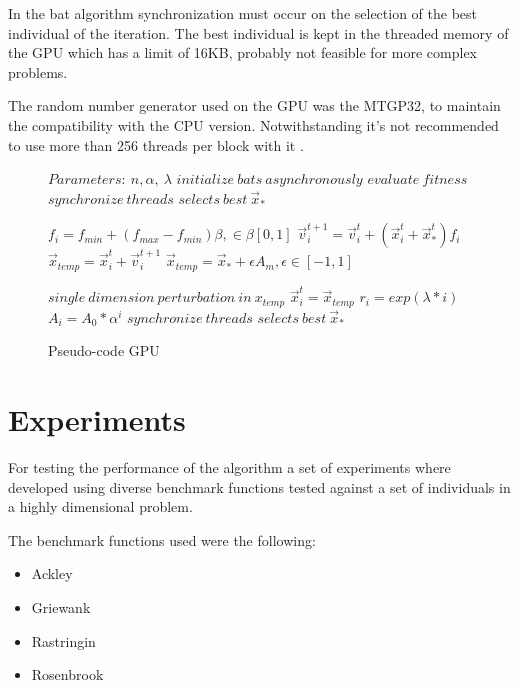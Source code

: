\documentclass[conference]{IEEEtran}
\begin{document}
In the bat algorithm synchronization must occur on the selection of the
best individual of the iteration. The best individual is kept in the
threaded memory of the GPU which has a limit of 16KB, probably not feasible for
more complex problems.

The random number generator used on the GPU was the MTGP32, to
maintain the compatibility with the CPU version. Notwithstanding
it's not recommended to use more than 256 threads per block with it
\cite{curandIssue}.


\begin{figure}
\begin{algorithmic}[1]
\State $Parameters:\ n,\alpha,\ \lambda$
\State $initialize\ bats\ asynchronously$
\State $evaluate\ fitness$
\State $synchronize\ threads$
\State $selects\ best\ \vec{x}_*$

        \State $f_i=f_{min} + (f_{max} - f_{min})\beta, \in \beta [0,1]$
        \State $\vec{v}_i^{t+1} = \vec{v}_i^{t} + (\vec{x}_i^{t} + \vec{x}_*^{t})f_i$
        \State $\vec{x}_{temp} = \vec{x}_i^{t} + \vec{v}_i^{t+1}$
            \State $\vec{x}_{temp} = \vec{x}_* + \epsilon A_m, \epsilon \in [-1, 1]$
        \EndIf

        \State $single\ dimension\ perturbation\ in\ x_{temp}$
            \State $\vec{x}_i^t = \vec{x}_{temp}$
            \State $r_i = exp(\lambda * i)$
            \State $A_i =  A_{0} * \alpha^i$
        \EndIf
        \State $synchronize\ threads$
        \State $selects\ best\ \vec{x}_*$
    \EndFor
\EndWhile
\end{algorithmic}
\caption{Pseudo-code GPU}\label{gpu-pseudo}
\end{figure}

\section{Experiments} \label{experiments}%

For testing the performance of the algorithm a set of experiments where
developed using diverse benchmark functions tested against a set of
individuals in a highly dimensional problem.

The benchmark functions used were the following:

\begin{itemize}
    \item Ackley
    \item Griewank
    \item Rastringin
    \item Rosenbrook
\end{itemize}
\end{document}
